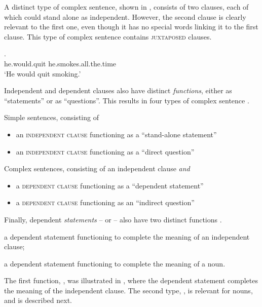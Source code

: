 A distinct type of complex sentence, shown in , consists of two clauses, each of which could stand alone as independent. However, the second clause is clearly relevant to the first one, even though it has no special words linking it to the first clause. This type of complex sentence contains \textsc{juxtaposed} clauses.

\ea\label{ex:dependentclausesoundsindependent} 
\gll [A:hęni:hę́:ˀ] [hahjáotaˀ].\\
he.would.quit he.smokes.all.the.time\\
\glt ‘He would quit smoking.’ 
\z
	
Independent and dependent clauses also have distinct \emph{functions}, either as “statements” or as “questions”. This results in four types of complex sentence . 

\ea\label{ex:clausetypeex} 
\ea Simple sentences, consisting of\label{ex:clausetypeexa}
\begin{itemize}
    \item an \textsc{independent clause} functioning as a “stand-alone statement” 
    \item an \textsc{independent clause} functioning as a “direct question” 
\end{itemize}

\ex Complex sentences, consisting of an independent clause \emph{and}\label{ex:clausetypeexb}
\begin{itemize}
    \item a \textsc{dependent clause} functioning as a “dependent statement” 
    \item a \textsc{dependent clause} functioning as an “indirect question” 
\end{itemize} 
\z
\z

Finally, dependent \emph{statements} --  or  -- also have two distinct functions . 

\ea\label{ex:clausetypeex100}
\ea a dependent statement functioning to complete the meaning of an independent clause;\label{ex:clausetypeex100a}

\ex a dependent statement functioning to complete the meaning of a noun.\label{ex:clausetypeex100b}
\z
\z 

The first function, , was illustrated in , where the dependent statement completes the meaning of the independent clause. The second type, , is relevant for nouns, and is described next. 


